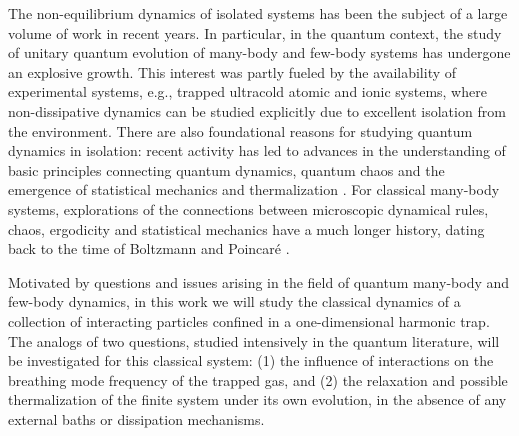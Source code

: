 \documentclass[a4paper, onecolumn]{revtex4-1}
\begin{document}
The non-equilibrium dynamics of isolated systems has been the subject of a large volume of work in
recent years.  In particular, in the quantum context, the study of unitary quantum evolution of
many-body and few-body systems has undergone an explosive growth.  This interest was partly fueled
by the availability of experimental systems, e.g., trapped ultracold atomic and ionic systems, where
non-dissipative dynamics can be studied explicitly due to excellent isolation from the environment.
There are also foundational reasons for studying quantum dynamics in isolation: recent activity has
led to advances in the understanding of basic principles connecting quantum dynamics, quantum chaos
and the emergence of statistical mechanics and thermalization \cite{PolkovnikovRigol_AdvPhys2016,
  BorgonoviIzrailevSantos_PhysRep2016}.  For classical many-body systems, explorations of the
connections between microscopic dynamical rules, chaos, ergodicity and statistical mechanics have a
much longer history, dating back to the time of Boltzmann and Poincar\'e \cite{Gaspard_book_1998,
  Dorfman_book_1999, Dumas_book_KAMstory, Boltzmann_legacy_book, EckmannRuelle_RMP85,
  Gaspard_PhysicaA06}.

Motivated by questions and issues arising in the field of quantum many-body and few-body dynamics,
in this work we will study the classical dynamics of a collection of interacting particles confined
in a one-dimensional harmonic trap.  The analogs of two questions, studied intensively in the
quantum literature, will be investigated for this classical system: (1) the influence of
interactions on the breathing mode frequency of the trapped gas, and (2) the relaxation and possible
thermalization of the finite system under its own evolution, in the absence of any external baths or
dissipation mechanisms.
\end{document}
